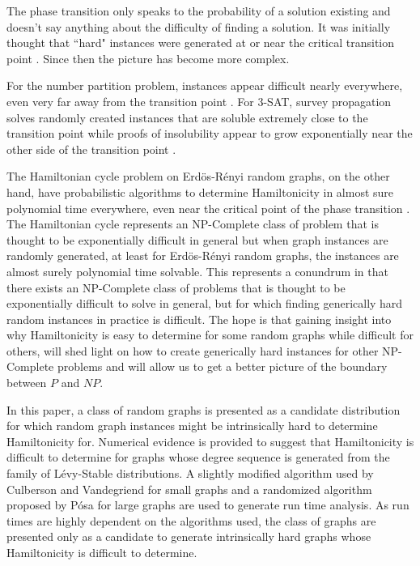 \documentclass[twoside,11pt]{article}
\begin{document}
The phase transition only speaks to the probability of a solution existing and doesn't say anything about
the difficulty of finding a solution.  It was initially thought
that ``hard" instances were generated at or near the critical transition point \cite{cheeseman}.
Since then the picture has become more complex.

For the number partition problem, instances appear difficult nearly everywhere, 
even very far away from the transition point \cite{gent,gent_npp_an}.  For 3-SAT, survey propagation \cite{zecchina} solves randomly
created instances that are soluble extremely close to the transition point while proofs of insolubility
appear to grow exponentially near the other side of the transition point \cite{beame_karp_pitassi_saks,ben_sasson_widgerson,li_gerard}.

The Hamiltonian cycle problem on Erd\"os-R\'enyi random graphs, on the other hand,
have probabilistic algorithms to determine Hamiltonicity in almost sure polynomial time everywhere,
even near the critical point of the phase transition \cite{bollobas_fenner_frieze,angluin,shamir,bollobas}.
The Hamiltonian cycle represents an NP-Complete class of problem that is thought to 
be exponentially difficult in general 
but when graph instances are randomly generated, at least for Erd\"os-R\'enyi random
graphs, the instances are almost surely polynomial time solvable.
This represents a conundrum in that there exists an NP-Complete class of problems
that is thought to be exponentially difficult to solve in general, but for which
finding generically hard random instances in practice is difficult.  
The hope is that gaining insight into why Hamiltonicity is easy to determine for some random graphs 
while difficult for others, will shed light on how to create generically hard instances
for other NP-Complete problems 
and will allow us to get a better picture of the boundary
between $P$ and $NP$.

In this paper, a class of random graphs is presented as a candidate distribution for which
random graph instances might be intrinsically hard to determine Hamiltonicity for.
Numerical evidence is provided to suggest that Hamiltonicity is difficult to determine
for graphs whose degree sequence is generated from the
family of L\'evy-Stable distributions.
A slightly modified algorithm used by Culberson and Vandegriend \citeyear{vandegriend}
for small graphs and a randomized
algorithm proposed by P\'osa \citeyear{posa} for large graphs are used to generate run time analysis.  As run times
are highly dependent on the algorithms used, the class of graphs are presented
only as a candidate to generate intrinsically hard graphs whose Hamiltonicity is difficult to determine.
\end{document}
